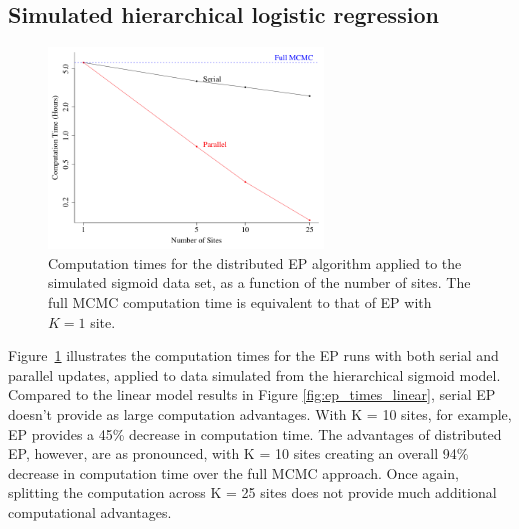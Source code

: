 \subsection{Simulated hierarchical logistic regression}
\label{subsec:ep_results_logistic}

\begin{figure}
\centering
   \includegraphics[width=0.65\textwidth]{figures/ep_sim/sigmoid_times.png}
\caption{Computation times for the distributed EP algorithm applied to the simulated sigmoid data set, as a function of the number of sites. The full MCMC computation time is equivalent to that of EP with $K=1$ site.}\label{fig:ep_times_sigmoid}
\end{figure}

Figure~\ref{fig:ep_times_sigmoid} illustrates the computation times for the EP runs with both serial and parallel updates, applied to data simulated from the hierarchical sigmoid model. Compared to the linear model results in Figure \ref{fig:ep_times_linear}, serial EP doesn't provide as large computation advantages. With K = 10 sites, for example, EP provides a 45\% decrease in computation time. The advantages of distributed EP, however, are as pronounced, with K = 10 sites creating an overall 94\% decrease in computation time over the full MCMC approach. Once again, splitting the computation across K = 25 sites does not provide much additional computational advantages.

